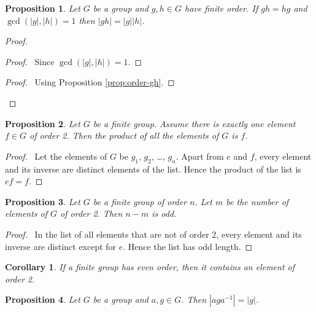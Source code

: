 \documentclass{book}
\let\qed\relax
\newtheorem{prop}{Proposition}[chapter]
\newtheorem{cor}{Corollary}[prop]
\theoremstyle{definition}
\newcommand{\inv}[1]{\ensuremath{{#1}^{-1}}}
\begin{document}
\begin{prop}
    \label{prop:order-gh-if-gcd-one}
    Let $G$ be a group and $g,h \in G$ have finite order. If $gh=hg$ and $\gcd(|g|,|h|) = 1$ then $|gh| = |g||h|$.
\end{prop}

\begin{proof}
    \pf
    \step{2}{$g^N = (\inv{h})^N$}
    \begin{proof}
        \pf\ Since $\gcd(|g|,|h|) = 1$.
    \end{proof}
    \begin{proof}
        \pf\ Using Proposition \ref{prop:order-gh}.
    \end{proof}
    \qed
\end{proof}

\begin{prop}
    \label{prop:product-of-all-elements}
    Let $G$ be a finite group. Assume there is exactly one element $f \in G$ of order 2. Then the product of all the elements of $G$ is $f$.
\end{prop}

\begin{proof}
    \pf\ Let the elements of $G$ be $g_1$, $g_2$, \ldots, $g_n$. Apart from $e$ and $f$, every element and its inverse are distinct elements of the list. Hence the product of the list is $ef = f$. \qed
\end{proof}

\begin{prop}
    Let $G$ be a finite group of order $n$. Let $m$ be the number of elements of $G$ of order 2. Then $n-m$ is odd.
\end{prop}

\begin{proof}
    \pf\ In the list of all elements that are not of order 2, every element and its inverse are distinct except for $e$. Hence the list has odd length. \qed
\end{proof}

\begin{cor}
    If a finite group has even order, then it contains an element of order 2.
\end{cor}

\begin{prop}
    Let $G$ be a group and $a,g \in G$. Then $|ag\inv{a}| = |g|$.
\end{prop}
\end{document}
